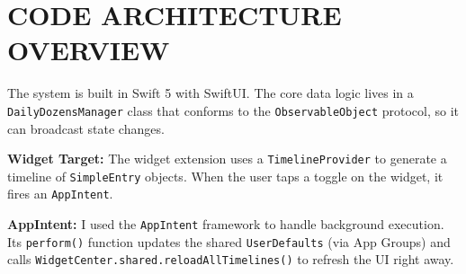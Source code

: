 \documentclass[10pt,twocolumn]{article}
\begin{document}
\section{CODE ARCHITECTURE OVERVIEW}

The system is built in Swift 5 with SwiftUI. The core data logic lives in a \texttt{DailyDozensManager} class that conforms to the \texttt{ObservableObject} protocol, so it can broadcast state changes.

\noindent\textbf{Widget Target:} The widget extension uses a \texttt{TimelineProvider} to generate a timeline of \texttt{SimpleEntry} objects. When the user taps a toggle on the widget, it fires an \texttt{AppIntent}.

\noindent\textbf{AppIntent:} I used the \texttt{AppIntent} framework to handle background execution. Its \texttt{perform()} function updates the shared \texttt{UserDefaults} (via App Groups) and calls \texttt{WidgetCenter.shared.reloadAllTimelines()} to refresh the UI right away.

\printbibliography
\end{document}
